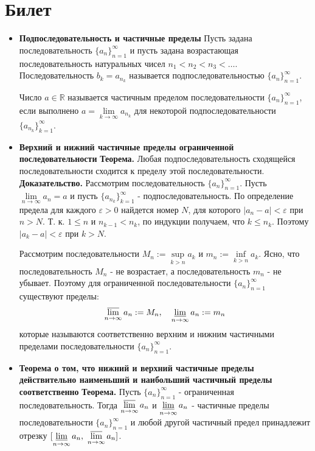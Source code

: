 \documentclass[12pt,a4paper]{article}
\begin{document}
\section{Билет}
\begin{itemize}

\item \textbf{ Подпоследовательность и частичные пределы}
Пусть задана последовательность $\{a_n\}_{n=1}^\infty$ и пусть задана возрастающая последовательность натуральных чисел $n_1 < n_2 < n_3 < \ldots$. Последовательность $b_k = a_{n_k}$ называется подпоследовательностью $\{a_n\}_{n=1}^\infty$.

Число $a \in \mathbb{R}$ называется частичным пределом последовательности $\{a_n\}_{n=1}^\infty$, если выполнено $a = \lim\limits_{k \to \infty}{a_{n_k}}$ для некоторой подпоследовательности $\{a_{n_k}\}_{k=1}^\infty$.

\item \textbf{Верхний и нижний частичные пределы ограниченной последовательности}
\textbf{Теорема.} Любая подпоследовательность сходящейся последовательности сходится к пределу этой последовательности.
\textbf{Доказательство.}
Рассмотрим последовательность $\{a_n\}_{n=1}^\infty$. Пусть $\lim\limits_{n \to \infty}{a_n} = a$ и пусть $\{a_{n_k}\}_{k=1}^\infty$ - подпоследовательность. По определение предела для каждого $\varepsilon > 0$ найдется номер $N$, для которого $|a_n - a| < \varepsilon$ при $n > N$. Т. к. $1 \leq n$ и $n_{k-1} < n_k$, по индукции получаем, что $k \leq n_k$. Поэтому $|a_k - a| < \varepsilon$ при $k > N$.

Рассмотрим последовательности $M_n := \sup\limits_{k>n}{a_k}$ и $m_n := \inf\limits_{k>n}{a_k}$. Ясно, что последовательность $M_n$ - не возрастает, а последовательность $m_n$ - не убывает. Поэтому для ограниченной последовательности $\{a_n\}_{n=1}^\infty$ существуют пределы:
\[
    \varlimsup_{n \to \infty}{a_n} := M_n 
    ,\ \ \
    \varliminf_{n \to \infty}{a_n} := m_n 
\]
которые называются соответственно верхним и нижним частичными пределами последовательности $\{a_n\}_{n=1}^\infty$.

\item\textbf{ Теорема о том, что нижний и верхний частичные пределы действительно наименьший и наибольший частичный пределы соответственно}
\textbf{Теорема.} Пусть $\{a_n\}_{n=1}^\infty$ - ограниченная последовательность. Тогда $\varlimsup\limits_{n \to \infty}{a_n}$ и $\varliminf\limits_{n \to \infty}{a_n}$  - частичные пределы последовательности $\{a_n\}_{n=1}^\infty$ и любой другой частичный предел принадлежит отрезку $[\varliminf\limits_{n \to \infty}{a_n},\ \varlimsup\limits_{n \to \infty}{a_n}]$.


\end{itemize}
\end{document}
